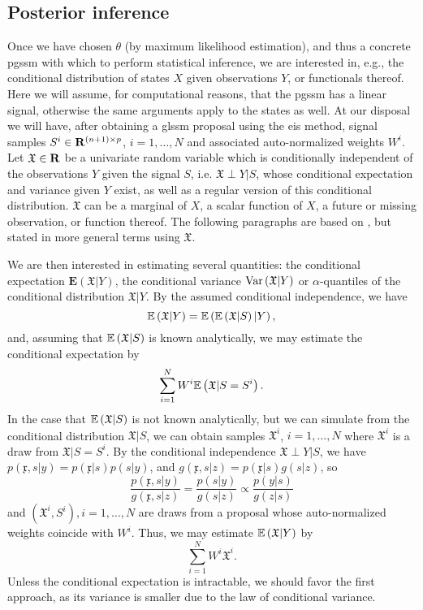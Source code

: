 \subsection{Posterior inference}
\label{subsec:inference}
Once we have chosen $\theta$ (by maximum likelihood estimation), and thus a concrete \acrshort{pgssm} with which to perform statistical inference, we are interested in, e.g., the conditional distribution of states $X$ given observations $Y$, or functionals thereof. 
Here we will assume, for computational reasons, that the \acrshort{pgssm} has a linear signal, otherwise the same arguments apply to the states as well.
At our disposal we will have, after obtaining a \acrshort{glssm} proposal using the \acrshort{eis} method, signal samples $S^{i}\in \mathbf R^{(n+1)\times p}$, $i = 1, \dots, N$ and associated auto-normalized weights $W^{i}$. 
Let $\mathfrak X \in \mathbf R$ be a univariate random variable which is conditionally independent of the observations $Y$ given the signal $S$, i.e. $\mathfrak X \perp Y | S$, whose conditional expectation and variance given $Y$ exist, as well as a regular version of this conditional distribution. $\mathfrak X$ can be a marginal of $X$, a scalar function of $X$, a future or missing observation, or function thereof. The following paragraphs are based on \citep[Section 11.5]{Durbin2012Time}, but stated in more general terms using $\mathfrak X$.

We are then interested in estimating several quantities: the conditional expectation $\mathbf E \left( \mathfrak X | Y \right)$, the conditional variance $\operatorname{Var} \left( \mathfrak X | Y \right)$ or $\alpha$-quantiles of the conditional distribution $\mathfrak X | Y$. By the assumed conditional independence, we have
$$
    \mathbb E \left( \mathfrak X | Y\right) = \mathbb E \left( \mathbb E \left( \mathfrak X | S \right) | Y \right),
$$
and, assuming that $\mathbb E \left( \mathfrak X | S \right)$ is known analytically, we may estimate the conditional expectation by
$$
\sum_{i = 1}^N W^{i} \mathbb E \left( \mathfrak X | S = S^{i} \right).
$$
In the case that $\mathbb E \left( \mathfrak X | S \right)$ is not known analytically, but we can simulate from the conditional distribution $\mathfrak X | S$, we can obtain samples $\mathfrak X^{i}$, $i = 1, \dots, N$ where $\mathfrak X^{i}$ is a draw from $\mathfrak X| S = S^{i}$. By the conditional independence $\mathfrak X \perp Y | S$, we have $p(\mathfrak x, s | y) = p(\mathfrak x | s) p(s | y)$, and $g(\mathfrak x, s | z) = p(\mathfrak x | s)g(s|z)$, so 
$$
    \frac{p(\mathfrak x, s|y)}{g(\mathfrak x, s | z)} = \frac{p(s | y)}{g(s|z)} \propto \frac{p(y|s)}{g(z|s)}
$$
and $(\mathfrak X^{i}, S^{i}), i = 1,\dots, N$ are draws from a proposal whose auto-normalized weights coincide with $W^{i}$. Thus, we may estimate $\mathbb E \left( \mathfrak X | Y \right)$ by
$$
    \sum_{i = 1}^N W^{i} \mathfrak X^{i}.
$$
Unless the conditional expectation is intractable, we should favor the first approach, as its variance is smaller due to the law of conditional variance.

